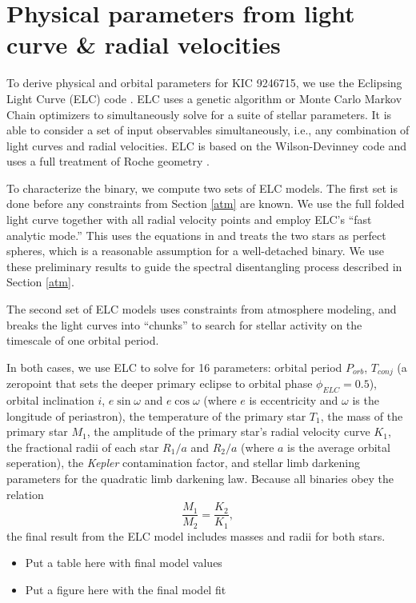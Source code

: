 \section{Physical parameters from light curve \& radial velocities}\label{model}
To derive physical and orbital parameters for KIC 9246715, we use the Eclipsing Light Curve (ELC) code \citep{oro00}. ELC uses a genetic algorithm or Monte Carlo Markov Chain optimizers to simultaneously solve for a suite of stellar parameters. It is able to consider a set of input observables simultaneously, i.e., any combination of light curves and radial velocities. ELC is based on the Wilson-Devinney code \citep{wil71} and uses a full treatment of Roche geometry \citep{avn75}.

To characterize the binary, we compute two sets of ELC models. The first set is done before any constraints from Section \ref{atm} are known. We use the full folded light curve together with all radial velocity points and employ ELC's ``fast analytic mode.'' This uses the equations in \citep{gim06} and treats the two stars as perfect spheres, which is a reasonable assumption for a well-detached binary. We use these preliminary results to guide the spectral disentangling process described in Section \ref{atm}.

The second set of ELC models uses constraints from atmosphere modeling, and breaks the light curves into ``chunks'' to search for stellar activity on the timescale of one orbital period.

In both cases, we use ELC to solve for 16 parameters: orbital period $P_{orb}$, $T_{conj}$ (a zeropoint that sets the deeper primary eclipse to orbital phase $\phi_{ELC} = 0.5$), orbital inclination $i$, $e \sin \omega$ and $e \cos \omega$ (where $e$ is eccentricity and $\omega$ is the longitude of periastron), the temperature of the primary star $T_1$, the mass of the primary star $M_1$, the amplitude of the primary star's radial velocity curve $K_1$, the fractional radii of each star $R_1/a$ and $R_2/a$ (where $a$ is the average orbital seperation), the \emph{Kepler} contamination factor, and stellar limb darkening parameters for the quadratic limb darkening law. Because all binaries obey the relation
\begin{equation}
\frac{M_1}{M_2} = \frac{K_2}{K_1},
\end{equation}
the final result from the ELC model includes masses and radii for both stars.

\begin{itemize}
\item Put a table here with final model values
\item Put a figure here with the final model fit
\end{itemize}
